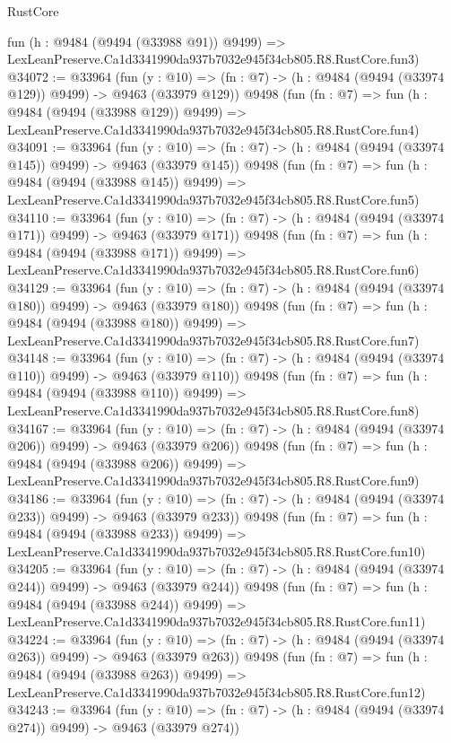\begin{lexlean}{RustCore}
\begin{coremodule}
    fun (h : @9484 (@9494 (@33988 @91)) @9499) =>
    LexLeanPreserve.Ca1d3341990da937b7032e945f34cb805.R8.RustCore.fun3)
@34072 := @33964
    (fun (y : @10) => (fn : @7) -> (h : @9484 (@9494 (@33974 @129)) @9499) -> @9463 (@33979 @129))
    @9498
    (fun (fn : @7) =>
    fun (h : @9484 (@9494 (@33988 @129)) @9499) =>
    LexLeanPreserve.Ca1d3341990da937b7032e945f34cb805.R8.RustCore.fun4)
@34091 := @33964
    (fun (y : @10) => (fn : @7) -> (h : @9484 (@9494 (@33974 @145)) @9499) -> @9463 (@33979 @145))
    @9498
    (fun (fn : @7) =>
    fun (h : @9484 (@9494 (@33988 @145)) @9499) =>
    LexLeanPreserve.Ca1d3341990da937b7032e945f34cb805.R8.RustCore.fun5)
@34110 := @33964
    (fun (y : @10) => (fn : @7) -> (h : @9484 (@9494 (@33974 @171)) @9499) -> @9463 (@33979 @171))
    @9498
    (fun (fn : @7) =>
    fun (h : @9484 (@9494 (@33988 @171)) @9499) =>
    LexLeanPreserve.Ca1d3341990da937b7032e945f34cb805.R8.RustCore.fun6)
@34129 := @33964
    (fun (y : @10) => (fn : @7) -> (h : @9484 (@9494 (@33974 @180)) @9499) -> @9463 (@33979 @180))
    @9498
    (fun (fn : @7) =>
    fun (h : @9484 (@9494 (@33988 @180)) @9499) =>
    LexLeanPreserve.Ca1d3341990da937b7032e945f34cb805.R8.RustCore.fun7)
@34148 := @33964
    (fun (y : @10) => (fn : @7) -> (h : @9484 (@9494 (@33974 @110)) @9499) -> @9463 (@33979 @110))
    @9498
    (fun (fn : @7) =>
    fun (h : @9484 (@9494 (@33988 @110)) @9499) =>
    LexLeanPreserve.Ca1d3341990da937b7032e945f34cb805.R8.RustCore.fun8)
@34167 := @33964
    (fun (y : @10) => (fn : @7) -> (h : @9484 (@9494 (@33974 @206)) @9499) -> @9463 (@33979 @206))
    @9498
    (fun (fn : @7) =>
    fun (h : @9484 (@9494 (@33988 @206)) @9499) =>
    LexLeanPreserve.Ca1d3341990da937b7032e945f34cb805.R8.RustCore.fun9)
@34186 := @33964
    (fun (y : @10) => (fn : @7) -> (h : @9484 (@9494 (@33974 @233)) @9499) -> @9463 (@33979 @233))
    @9498
    (fun (fn : @7) =>
    fun (h : @9484 (@9494 (@33988 @233)) @9499) =>
    LexLeanPreserve.Ca1d3341990da937b7032e945f34cb805.R8.RustCore.fun10)
@34205 := @33964
    (fun (y : @10) => (fn : @7) -> (h : @9484 (@9494 (@33974 @244)) @9499) -> @9463 (@33979 @244))
    @9498
    (fun (fn : @7) =>
    fun (h : @9484 (@9494 (@33988 @244)) @9499) =>
    LexLeanPreserve.Ca1d3341990da937b7032e945f34cb805.R8.RustCore.fun11)
@34224 := @33964
    (fun (y : @10) => (fn : @7) -> (h : @9484 (@9494 (@33974 @263)) @9499) -> @9463 (@33979 @263))
    @9498
    (fun (fn : @7) =>
    fun (h : @9484 (@9494 (@33988 @263)) @9499) =>
    LexLeanPreserve.Ca1d3341990da937b7032e945f34cb805.R8.RustCore.fun12)
@34243 := @33964
    (fun (y : @10) => (fn : @7) -> (h : @9484 (@9494 (@33974 @274)) @9499) -> @9463 (@33979 @274))

\end{coremodule}
\end{lexlean}
